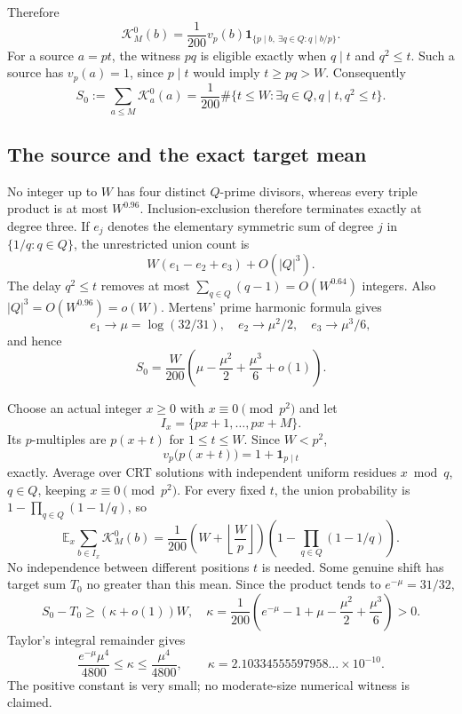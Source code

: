 \documentclass[a4paper,11pt]{article}
\theoremstyle{remark}\newtheorem{remark}[theorem]{Remark}
\newcommand{\K}{\mathcal K}
\begin{document}
Therefore
\[
 \K_M^0(b)=\frac1{200}v_p(b)
  \mathbf1_{\{p\mid b,\ \exists q\in Q:q\mid b/p\}}.
\]
For a source $a=pt$, the witness $pq$ is eligible exactly when $q\mid t$ and $q^2\le t$. Such a source has $v_p(a)=1$, since $p\mid t$ would imply $t\ge pq>W$. Consequently
\begin{equation}\label{eq:counter-source}
 S_0:=\sum_{a\le M}\K_a^0(a)
 =\frac1{200}\#\{t\le W:\exists q\in Q, q\mid t, q^2\le t\}.
\end{equation}

\subsection{The source and the exact target mean}
No integer up to $W$ has four distinct $Q$-prime divisors, whereas every triple product is at most $W^{0.96}$. Inclusion-exclusion therefore terminates exactly at degree three. If $e_j$ denotes the elementary symmetric sum of degree $j$ in $\{1/q:q\in Q\}$, the unrestricted union count is
\[
 W(e_1-e_2+e_3)+O(|Q|^3).
\]
The delay $q^2\le t$ removes at most $\sum_{q\in Q}(q-1)=O(W^{0.64})$ integers. Also $|Q|^3=O(W^{0.96})=o(W)$. Mertens' prime harmonic formula gives
\[
 e_1\longrightarrow\mu=\log(32/31),\quad
 e_2\longrightarrow\mu^2/2,\quad e_3\longrightarrow\mu^3/6,
\]
and hence
\begin{equation}\label{eq:counter-source-asym}
 S_0=\frac W{200}\left(\mu-\frac{\mu^2}{2}+\frac{\mu^3}{6}+o(1)\right).
\end{equation}

Choose an actual integer $x\ge0$ with $x\equiv0\pmod{p^2}$ and let
\[
 I_x=\{px+1,\ldots,px+M\}.
\]
Its $p$-multiples are $p(x+t)$ for $1\le t\le W$. Since $W<p^2$,
\[
 v_p\bigl(p(x+t)\bigr)=1+\mathbf1_{p\mid t}
\]
exactly. Average over CRT solutions with independent uniform residues $x\bmod q$, $q\in Q$, keeping $x\equiv0\pmod{p^2}$. For every fixed $t$, the union probability is $1-\prod_{q\in Q}(1-1/q)$, so
\begin{equation}\label{eq:counter-target-exact}
 \mathbb E_x\sum_{b\in I_x}\K_M^0(b)
 =\frac1{200}\left(W+\left\lfloor\frac Wp\right\rfloor\right)
       \left(1-\prod_{q\in Q}(1-1/q)\right).
\end{equation}
No independence between different positions $t$ is needed. Some genuine shift has target sum $T_0$ no greater than this mean. Since the product tends to $e^{-\mu}=31/32$,
\[
 S_0-T_0\ge(\kappa+o(1))W,
\quad
 \kappa=\frac1{200}\left(e^{-\mu}-1+\mu-\frac{\mu^2}{2}+\frac{\mu^3}{6}\right)>0.
\]
Taylor's integral remainder gives
\[
 \frac{e^{-\mu}\mu^4}{4800}\le\kappa\le\frac{\mu^4}{4800},
 \qquad \kappa=2.10334555597958\ldots\times10^{-10}.
\]
The positive constant is very small; no moderate-size numerical witness is claimed.
\end{document}
